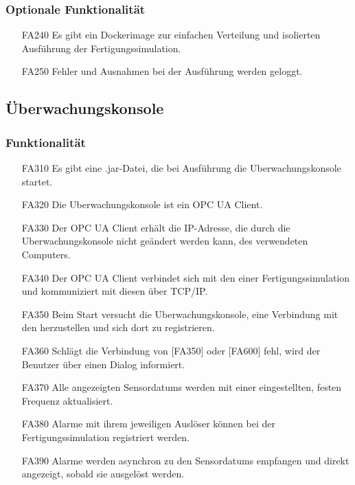 \documentclass[parskip=full]{scrartcl}
\begin{document}
\subsubsection{Optionale Funktionalität}
\label{fertigung-optional}
\begin{enumerate}
  \item[FA240] Es gibt ein \gls{Dockerimage} zur einfachen Verteilung und isolierten Ausführung der \gls{Fertigungssimulation}.
  \item[FA250] Fehler und Ausnahmen bei der Ausführung werden geloggt.
\end{enumerate}

\subsection{Überwachungskonsole}
\subsubsection{Funktionalität}
\begin{enumerate}
  \item[FA310] Es gibt eine .jar-Datei, die bei Ausführung die \gls{Uberwachungskonsole} startet.
  \item[FA320] Die \gls{Uberwachungskonsole} ist ein \gls{OPC UA Client}.
  \item[FA330] Der \gls{OPC UA Client} erhält die \gls{IP-Adresse}, die durch die \gls{Uberwachungskonsole} nicht geändert werden kann, des verwendeten Computers.
  \item[FA340] Der \gls{OPC UA Client} verbindet sich mit den  einer \gls{Fertigungssimulation} und kommuniziert mit diesen über \gls{TCP/IP}.
  \item[FA350] Beim Start versucht die \gls{Uberwachungskonsole}, eine Verbindung mit den  herzustellen und sich dort zu registrieren.
  \item[FA360] Schlägt die Verbindung von [FA350] oder [FA600] fehl, wird der Benutzer über einen Dialog informiert.
  \item[FA370] Alle angezeigten \glspl{Sensordatum} werden mit einer eingestellten, festen Frequenz aktualisiert.
  \item[FA380] Alarme mit ihrem jeweiligen Auslöser können bei der \gls{Fertigungssimulation} registriert werden.
  \item[FA390] Alarme werden asynchron zu den \glspl{Sensordatum} empfangen und direkt angezeigt, sobald sie ausgelöst werden.
\end{enumerate}
\end{document}
